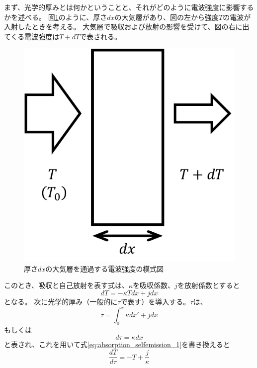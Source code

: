 まず、光学的厚みとは何かということと、それがどのように電波強度に影響するかを述べる。
図\ref{fig:depth_dx}のように、厚さ$dx$の大気層があり、図の左から強度$T$の電波が入射したときを考える。
大気層で吸収および放射の影響を受けて、図の右に出てくる電波強度は$T+dT$で表される。
\begin{figure}[htbp]
    \centering
    \includegraphics{master_thesis_contents/master_thesis_fig/depth_dx.pdf}
    \caption{厚さ$dx$の大気層を通過する電波強度の模式図}
    \label{fig:depth_dx}
\end{figure}
このとき、吸収と自己放射を表す式は、$\kappa$を吸収係数、$j$を放射係数とすると
\begin{equation}
    dT = -\kappa T dx + j dx
    \label{eq:absorption_selfemission_1}
\end{equation}
となる。
次に光学的厚み（一般的に$\tau$で表す）を導入する。$\tau$は、
\begin{equation}
    \tau = \int_{0}^{x} \kappa dx' + j dx
\end{equation}
もしくは
\begin{equation}
    d\tau = \kappa dx
\end{equation}
と表され、これを用いて式\eqref{eq:absorption_selfemission_1}を書き換えると
\begin{equation}
    \frac{dT}{d\tau} = -T + \frac{j}{\kappa}
    \label{eq:absorption_selfemission_4}
\end{equation}
